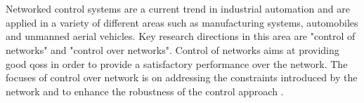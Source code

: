 \chapter{}
\label{sec:state_of_the_art}

Networked control systems are a current trend in industrial automation and are applied in a variety of different areas such as manufacturing systems, automobiles and unmanned aerial vehicles. Key research directions in this area are "control of networks" and "control over networks". Control of networks aims at providing good \glspl{qos} in order to provide a satisfactory performance over the network. The focuses of control over network is on addressing the constraints introduced by the network and to enhance the robustness of the control approach \cite{zhang_networked_2020}.


